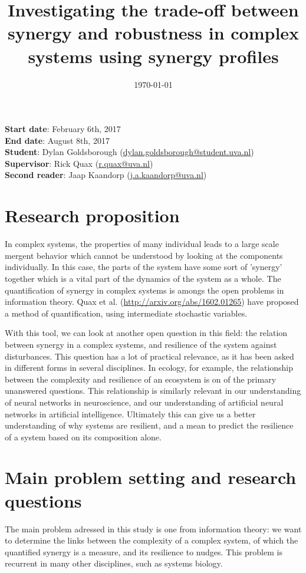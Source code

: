 \documentclass[11pt]{article}
\title{Investigating the trade-off between synergy and robustness in complex systems using synergy profiles}
\date{\today}
\begin{document}
\maketitle
\noindent
\textbf{Start date}: February 6th, 2017\\
\textbf{End date}: August 8th, 2017\\
\textbf{Student}: Dylan Goldsborough (\url{dylan.goldsborough@student.uva.nl})\\
\textbf{Supervisor}: Rick Quax (\url{r.quax@uva.nl})\\
\textbf{Second reader}: Jaap Kaandorp (\url{j.a.kaandorp@uva.nl})\\

\section{Research proposition}

In complex systems, the properties of many individual leads to a large scale mergent behavior which cannot be understood by looking at the components individually.
In this case, the parts of the system have some sort of 'synergy' together which is a vital part of the dynamics of the system as a whole.
The quantification of synergy in complex systems is amongs the open problems in information theory. 
Quax et al. (\url{http://arxiv.org/abs/1602.01265}) have proposed a method of quantification, using intermediate stochastic variables.

With this tool, we can look at another open question in this field: the relation between synergy in a complex systems, and resilience of the system against disturbances. 
This question has a lot of practical relevance, as it has been asked in different forms in several disciplines. 
In ecology, for example, the relationship between the complexity and resilience of an ecosystem is on of the primary unanswered questions.
This relationship is similarly relevant in our understanding of neural networks in neuroscience, and our understanding of artificial neural networks in artificial intelligence.
Ultimately this can give us a better understanding of why systems are resilient, and a mean to predict the resilience of a system based on its composition alone.

\section{Main problem setting and research questions}

The main problem adressed in this study is one from information theory: we want to determine the links between the complexity of a complex system, of which the quantified synergy is a measure, and its resilience to nudges. 
This problem is recurrent in many other disciplines, such as systems biology.
\end{document}
